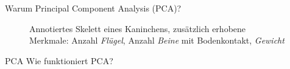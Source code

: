 \documentclass{beamer}
\begin{document}
\begin{frame}{Warum Principal Component Analysis (PCA)?}
{\begin{figure}
   \caption{Annotiertes Skelett eines Kaninchens, zusätzlich erhobene Merkmale: Anzahl \emph{Flügel}, Anzahl \emph{Beine} mit Bodenkontakt, \emph{Gewicht}}
  \end{figure}
 }
\end{frame}

\begin{frame}{PCA}
 Wie funktioniert PCA?
\end{frame}



\begin{frame}
 \printbibliography[heading=bibintoc]
\end{frame}
\end{document}
